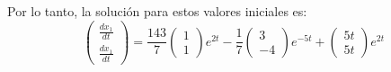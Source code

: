 Por lo tanto, la solución para estos valores iniciales es:
$$\begin{pmatrix}
\frac{dx_1}{dt}\\
\frac{dx_1}{dt}
\end{pmatrix} = \frac{143}{7} \begin{pmatrix}
     1\\
     1
     \end{pmatrix}e^{2t} - \frac{1}{7} \begin{pmatrix}
     3\\
     -4
     \end{pmatrix}e^{-5t} + \begin{pmatrix}
     5t\\
     5t
     \end{pmatrix}e^{2t}$$
     
